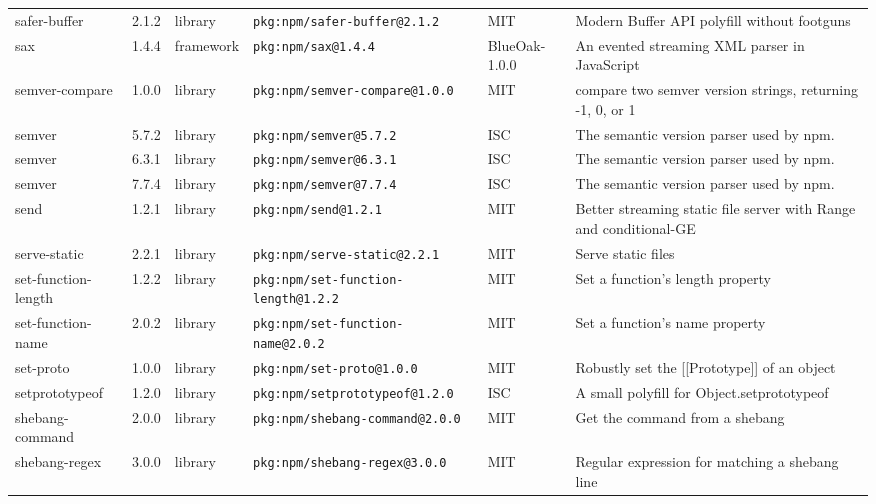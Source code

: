 \documentclass[11pt,a4paper]{article}
\begin{document}
\begin{longtable}{|p{4cm}|p{2cm}|p{1.6cm}|p{5cm}|p{1.5cm}|p{3.5cm}|}
\raggedright safer-buffer & 2.1.2 & library & \small\texttt{pkg:npm/safer-buffer@2.1.2} & MIT & \small Modern Buffer API polyfill without footguns \\
\raggedright sax & 1.4.4 & framework & \small\texttt{pkg:npm/sax@1.4.4} & BlueOak-1.0.0 & \small An evented streaming XML parser in JavaScript \\
\raggedright semver-compare & 1.0.0 & library & \small\texttt{pkg:npm/semver-compare@1.0.0} & MIT & \small compare two semver version strings, returning -1, 0, or 1 \\
\raggedright semver & 5.7.2 & library & \small\texttt{pkg:npm/semver@5.7.2} & ISC & \small The semantic version parser used by npm. \\
\raggedright semver & 6.3.1 & library & \small\texttt{pkg:npm/semver@6.3.1} & ISC & \small The semantic version parser used by npm. \\
\raggedright semver & 7.7.4 & library & \small\texttt{pkg:npm/semver@7.7.4} & ISC & \small The semantic version parser used by npm. \\
\raggedright send & 1.2.1 & library & \small\texttt{pkg:npm/send@1.2.1} & MIT & \small Better streaming static file server with Range and conditional-GE \\
\raggedright serve-static & 2.2.1 & library & \small\texttt{pkg:npm/serve-static@2.2.1} & MIT & \small Serve static files \\
\raggedright set-function-length & 1.2.2 & library & \small\texttt{pkg:npm/set-function-length@1.2.2} & MIT & \small Set a function's length property \\
\raggedright set-function-name & 2.0.2 & library & \small\texttt{pkg:npm/set-function-name@2.0.2} & MIT & \small Set a function's name property \\
\raggedright set-proto & 1.0.0 & library & \small\texttt{pkg:npm/set-proto@1.0.0} & MIT & \small Robustly set the [[Prototype]] of an object \\
\raggedright setprototypeof & 1.2.0 & library & \small\texttt{pkg:npm/setprototypeof@1.2.0} & ISC & \small A small polyfill for Object.setprototypeof \\
\raggedright shebang-command & 2.0.0 & library & \small\texttt{pkg:npm/shebang-command@2.0.0} & MIT & \small Get the command from a shebang \\
\raggedright shebang-regex & 3.0.0 & library & \small\texttt{pkg:npm/shebang-regex@3.0.0} & MIT & \small Regular expression for matching a shebang line \\

\end{longtable}
\end{document}
